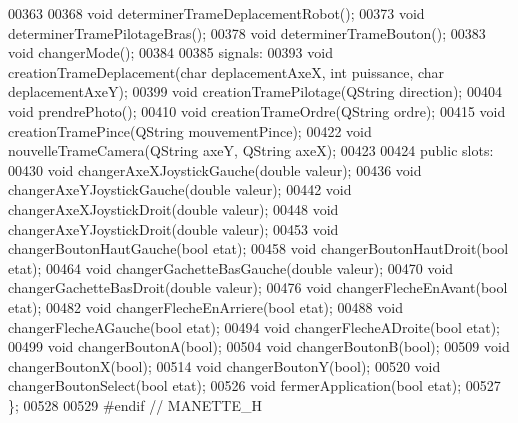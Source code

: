 \begin{DoxyCode}
00363 
00368     \textcolor{keywordtype}{void} determinerTrameDeplacementRobot();
00373     \textcolor{keywordtype}{void} determinerTramePilotageBras();
00378     \textcolor{keywordtype}{void} determinerTrameBouton();
00383     \textcolor{keywordtype}{void} changerMode();
00384 
00385 signals:
00393     \textcolor{keywordtype}{void} creationTrameDeplacement(\textcolor{keywordtype}{char} deplacementAxeX, \textcolor{keywordtype}{int} puissance, \textcolor{keywordtype}{char} deplacementAxeY);
00399     \textcolor{keywordtype}{void} creationTramePilotage(QString direction);
00404     \textcolor{keywordtype}{void} prendrePhoto();
00410     \textcolor{keywordtype}{void} creationTrameOrdre(QString ordre);
00415     \textcolor{keywordtype}{void} creationTramePince(QString mouvementPince);
00422     \textcolor{keywordtype}{void} nouvelleTrameCamera(QString axeY, QString axeX);
00423 
00424 \textcolor{keyword}{public} slots:
00430     \textcolor{keywordtype}{void} changerAxeXJoystickGauche(\textcolor{keywordtype}{double} valeur);
00436     \textcolor{keywordtype}{void} changerAxeYJoystickGauche(\textcolor{keywordtype}{double} valeur);
00442     \textcolor{keywordtype}{void} changerAxeXJoystickDroit(\textcolor{keywordtype}{double} valeur);
00448     \textcolor{keywordtype}{void} changerAxeYJoystickDroit(\textcolor{keywordtype}{double} valeur);
00453     \textcolor{keywordtype}{void} changerBoutonHautGauche(\textcolor{keywordtype}{bool} etat);
00458     \textcolor{keywordtype}{void} changerBoutonHautDroit(\textcolor{keywordtype}{bool} etat);
00464     \textcolor{keywordtype}{void} changerGachetteBasGauche(\textcolor{keywordtype}{double} valeur);
00470     \textcolor{keywordtype}{void} changerGachetteBasDroit(\textcolor{keywordtype}{double} valeur);
00476     \textcolor{keywordtype}{void} changerFlecheEnAvant(\textcolor{keywordtype}{bool} etat);
00482     \textcolor{keywordtype}{void} changerFlecheEnArriere(\textcolor{keywordtype}{bool} etat);
00488     \textcolor{keywordtype}{void} changerFlecheAGauche(\textcolor{keywordtype}{bool} etat);
00494     \textcolor{keywordtype}{void} changerFlecheADroite(\textcolor{keywordtype}{bool} etat);
00499     \textcolor{keywordtype}{void} changerBoutonA(\textcolor{keywordtype}{bool});
00504     \textcolor{keywordtype}{void} changerBoutonB(\textcolor{keywordtype}{bool});
00509     \textcolor{keywordtype}{void} changerBoutonX(\textcolor{keywordtype}{bool});
00514     \textcolor{keywordtype}{void} changerBoutonY(\textcolor{keywordtype}{bool});
00520     \textcolor{keywordtype}{void} changerBoutonSelect(\textcolor{keywordtype}{bool} etat);
00526     \textcolor{keywordtype}{void} fermerApplication(\textcolor{keywordtype}{bool} etat);
00527 \};
00528 
00529 \textcolor{preprocessor}{#endif // MANETTE\_H}
\end{DoxyCode}
